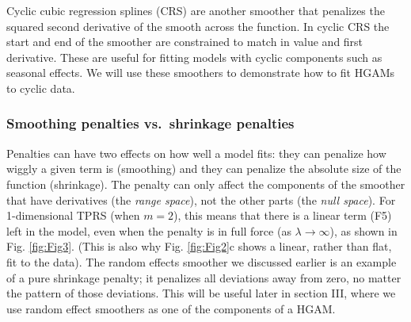 \documentclass[12pt]{article}
\begin{document}
Cyclic cubic regression splines (CRS) are another smoother that
penalizes the squared second derivative of the smooth across the
function. In cyclic CRS the start and end of the smoother are
constrained to match in value and first derivative. These are useful for
fitting models with cyclic components such as seasonal effects. We will
use these smoothers to demonstrate how to fit HGAMs to cyclic data.

\subsubsection{Smoothing penalties vs.~shrinkage
penalties}\label{smoothing-penalties-vs.shrinkage-penalties}

Penalties can have two effects on how well a model fits: they can
penalize how wiggly a given term is (smoothing) and they can penalize
the absolute size of the function (shrinkage). The penalty can only
affect the components of the smoother that have derivatives (the
\emph{range space}), not the other parts (the \emph{null space}). For
1-dimensional TPRS (when \(m=2\)), this means that there is a linear
term (F5) left in the model, even when the penalty is in full force (as
\(\lambda \rightarrow \infty\)), as shown in Fig. \ref{fig:Fig3}. (This
is also why Fig. \ref{fig:Fig2}c shows a linear, rather than flat, fit
to the data). The random effects smoother we discussed earlier is an
example of a pure shrinkage penalty; it penalizes all deviations away
from zero, no matter the pattern of those deviations. This will be
useful later in section III, where we use random effect smoothers as one
of the components of a HGAM.
\end{document}
